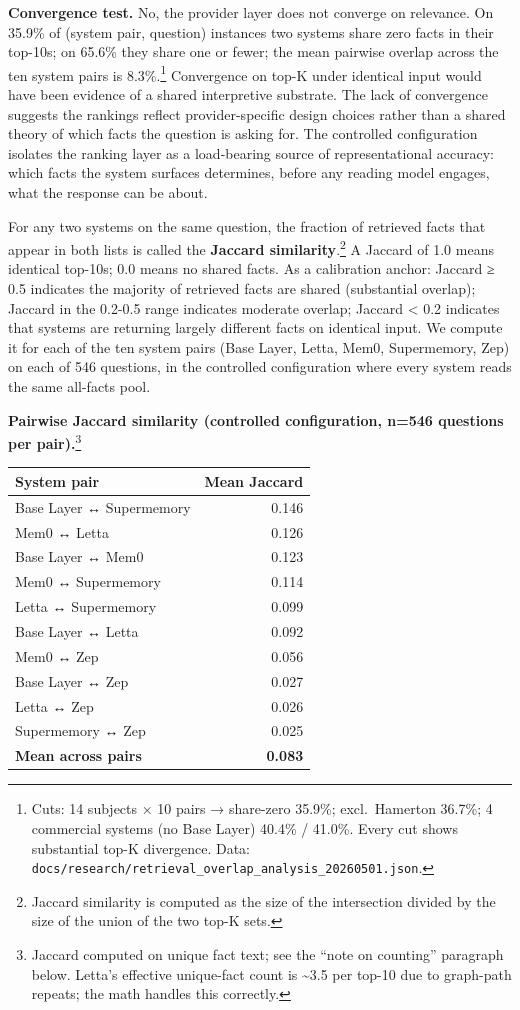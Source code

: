 \textbf{Convergence test.} No, the provider layer does not converge on
relevance. On 35.9\% of (system pair, question) instances two systems
share zero facts in their top-10s; on 65.6\% they share one or fewer;
the mean pairwise overlap across the ten system pairs is
8.3\%.\footnote{Cuts: 14 subjects × 10 pairs → share-zero 35.9\%;
  excl.~Hamerton 36.7\%; 4 commercial systems (no Base Layer) 40.4\%
  / 41.0\%. Every cut shows substantial top-K divergence. Data:
  \texttt{docs/research/retrieval\_overlap\_analysis\_20260501.json}.}
Convergence on top-K under identical input would have been evidence of a
shared interpretive substrate. The lack of convergence suggests the
rankings reflect provider-specific design choices rather than a shared
theory of which facts the question is asking for. The controlled
configuration isolates the ranking layer as a load-bearing source of
representational accuracy: which facts the system surfaces determines,
before any reading model engages, what the response can be about.

For any two systems on the same question, the fraction of retrieved
facts that appear in both lists is called the \textbf{Jaccard
similarity}.\footnote{Jaccard similarity is computed as the size of the
  intersection divided by the size of the union of the two top-K sets.}
A Jaccard of 1.0 means identical top-10s; 0.0 means no shared facts. As
a calibration anchor: Jaccard ≥ 0.5 indicates the majority of retrieved
facts are shared (substantial overlap); Jaccard in the 0.2-0.5 range
indicates moderate overlap; Jaccard \textless{} 0.2 indicates that
systems are returning largely different facts on identical input. We
compute it for each of the ten system pairs (Base Layer, Letta, Mem0,
Supermemory, Zep) on each of 546 questions, in the controlled
configuration where every system reads the same all-facts pool.

\textbf{Pairwise Jaccard similarity (controlled configuration, n=546
questions per pair).}\footnote{Jaccard computed on unique fact text;
  see the ``note on counting'' paragraph below. Letta's effective
  unique-fact count is \textasciitilde3.5 per top-10 due to graph-path
  repeats; the math handles this correctly.}

\begin{longtable}[]{@{}lr@{}}
\toprule
System pair & Mean Jaccard \\
\midrule
\endhead
Base Layer ↔ Supermemory & 0.146 \\
Mem0 ↔ Letta & 0.126 \\
Base Layer ↔ Mem0 & 0.123 \\
Mem0 ↔ Supermemory & 0.114 \\
Letta ↔ Supermemory & 0.099 \\
Base Layer ↔ Letta & 0.092 \\
Mem0 ↔ Zep & 0.056 \\
Base Layer ↔ Zep & 0.027 \\
Letta ↔ Zep & 0.026 \\
Supermemory ↔ Zep & 0.025 \\
\textbf{Mean across pairs} & \textbf{0.083} \\
\bottomrule
\end{longtable}

